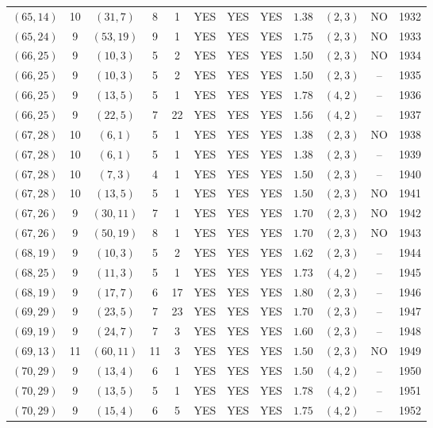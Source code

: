 \begin{longtable}{|c|c|c|c|c|c|c|c|c|c|c|c|}
$(65,14)$ & 10 & $(31,7)$ & 8 & 1 & YES & YES & YES & $1.38$ & $(2,3)$ & NO & 1932\\
$(65,24)$ & 9 & $(53,19)$ & 9 & 1 & YES & YES & YES & $1.75$ & $(2,3)$ & NO & 1933\\
$(66,25)$ & 9 & $(10,3)$ & 5 & 2 & YES & YES & YES & $1.50$ & $(2,3)$ & NO & 1934\\
$(66,25)$ & 9 & $(10,3)$ & 5 & 2 & YES & YES & YES & $1.50$ & $(2,3)$ & -- & 1935\\
$(66,25)$ & 9 & $(13,5)$ & 5 & 1 & YES & YES & YES & $1.78$ & $(4,2)$ & -- & 1936\\
$(66,25)$ & 9 & $(22,5)$ & 7 & 22 & YES & YES & YES & $1.56$ & $(4,2)$ & -- & 1937\\
$(67,28)$ & 10 & $(6,1)$ & 5 & 1 & YES & YES & YES & $1.38$ & $(2,3)$ & NO & 1938\\
$(67,28)$ & 10 & $(6,1)$ & 5 & 1 & YES & YES & YES & $1.38$ & $(2,3)$ & -- & 1939\\
$(67,28)$ & 10 & $(7,3)$ & 4 & 1 & YES & YES & YES & $1.50$ & $(2,3)$ & -- & 1940\\
$(67,28)$ & 10 & $(13,5)$ & 5 & 1 & YES & YES & YES & $1.50$ & $(2,3)$ & NO & 1941\\
$(67,26)$ & 9 & $(30,11)$ & 7 & 1 & YES & YES & YES & $1.70$ & $(2,3)$ & NO & 1942\\
$(67,26)$ & 9 & $(50,19)$ & 8 & 1 & YES & YES & YES & $1.70$ & $(2,3)$ & NO & 1943\\
$(68,19)$ & 9 & $(10,3)$ & 5 & 2 & YES & YES & YES & $1.62$ & $(2,3)$ & -- & 1944\\
$(68,25)$ & 9 & $(11,3)$ & 5 & 1 & YES & YES & YES & $1.73$ & $(4,2)$ & -- & 1945\\
$(68,19)$ & 9 & $(17,7)$ & 6 & 17 & YES & YES & YES & $1.80$ & $(2,3)$ & -- & 1946\\
$(69,29)$ & 9 & $(23,5)$ & 7 & 23 & YES & YES & YES & $1.70$ & $(2,3)$ & -- & 1947\\
$(69,19)$ & 9 & $(24,7)$ & 7 & 3 & YES & YES & YES & $1.60$ & $(2,3)$ & -- & 1948\\
$(69,13)$ & 11 & $(60,11)$ & 11 & 3 & YES & YES & YES & $1.50$ & $(2,3)$ & NO & 1949\\
$(70,29)$ & 9 & $(13,4)$ & 6 & 1 & YES & YES & YES & $1.50$ & $(4,2)$ & -- & 1950\\
$(70,29)$ & 9 & $(13,5)$ & 5 & 1 & YES & YES & YES & $1.78$ & $(4,2)$ & -- & 1951\\
$(70,29)$ & 9 & $(15,4)$ & 6 & 5 & YES & YES & YES & $1.75$ & $(4,2)$ & -- & 1952\\

\end{longtable}
